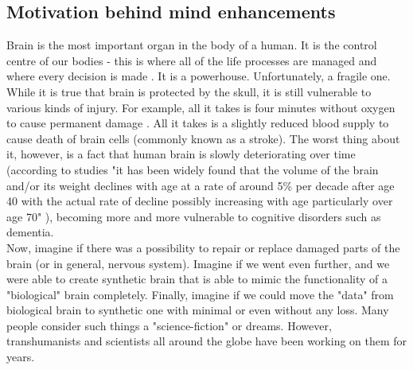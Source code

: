 \documentclass[12pt]{article}
\begin{document}
\subsection{Motivation behind mind enhancements}
	Brain is the most important organ in the body of a human. It is the control centre of our bodies - this is where all of the life processes are managed and where every decision is made \cite{brain:1}. It is a powerhouse. Unfortunately, a fragile one. While it is true that brain is protected by the skull, it is still vulnerable to various kinds of injury. For example, all it takes is four minutes without oxygen to cause permanent damage \cite{lackofoxygen}. All it takes is a slightly reduced blood supply to cause death of brain cells (commonly known as a stroke)\cite{stroke:1}. The worst thing about it, however, is a fact that human brain is slowly deteriorating over time (according to studies "it has been widely found that the volume of the brain and/or its weight declines with age at a rate of around 5\% per decade after age 40 with the actual rate of decline possibly increasing with age particularly over age 70" \cite{brainAging}), becoming more and more vulnerable to cognitive disorders such as dementia.
	\\Now, imagine if there was a possibility to repair or replace damaged parts of the brain (or in general, nervous system). Imagine if we went even further, and we were able to create synthetic brain that is able to mimic the functionality of a "biological" brain completely. Finally, imagine if we could move the "data" from biological brain to synthetic one with minimal or even without any loss. Many people consider such things a "science-fiction" or dreams. However, transhumanists and scientists all around the globe have been working on them for years.
\end{document}
